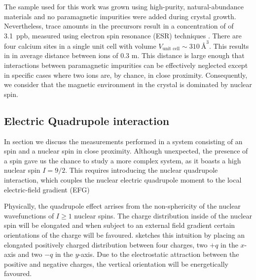 The sample used for this work was grown using high-purity, natural-abundance materials and no paramagnetic impurities were added during crystal growth. Nevertheless, trace amounts in the precursors result in a concentration of \Er of 3.1~ppb, measured using electron spin resonance (ESR) techniques . There are four calcium sites in a single unit cell with volume $V_{\text{unit cell}}\sim310\ \text{\AA}^3$. This results in in average distance between ions of 0.3 \textmu m.  
This distance is large enough that interactions between paramagnetic impurities can be effectively neglected except in specific cases where two ions are, by chance, in close proximity. Consequently, we consider that the magnetic environment in the crystal is dominated by \W nuclear spin.


\subsection{Electric Quadrupole interaction}

In section  we discuss the measurements performed in a system consisting of an \Er spin and a \Nb nuclear spin in close proximity. Although unexpected, the presence of a \Nb spin gave us the chance to study a more complex system, as it boasts a high nuclear spin $I=9/2$. This requires introducing the nuclear quadrupole interaction, which couples the nuclear electric quadrupole moment to the local electric-field gradient (EFG)

Physically, the quadrupole effect arrises from the non-sphericity of the nuclear wavefunctions of $I\geq1$ nuclear spins. The charge distribution inside of the nuclear spin will be elongated and when subject to an external field gradient certain orientations of the charge will be favoured.  sketches this intuition by placing an elongated positively charged distribution between four charges, two $+q$ in the $x$-axis and two $-q$ in the $y$-axis. Due to the electrostatic attraction between the positive and negative charges, the vertical orientation will be energetically favoured.

